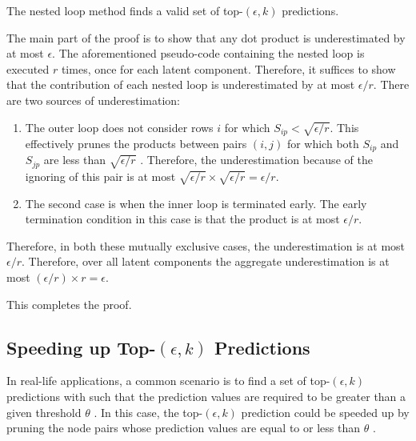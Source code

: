 \begin{prop}
\label{prop-valid-topk}
The nested loop method finds a valid set of top-$(\epsilon, k)$
predictions.
\end{prop}
\begin{IEEEproof}
The main part of the proof is to show that any dot product is
underestimated by at most  $\epsilon$. The aforementioned pseudo-code
containing the  nested loop is executed $r$ times, once for each
latent component. Therefore, it suffices to show that the
contribution of each nested loop is underestimated by at most
$\epsilon/r$. There are two sources of underestimation:
\begin{enumerate}
\item  The outer loop does not consider rows $i$ for which $S_{ip} <
\sqrt{\epsilon/r}$. This effectively prunes the products between
pairs $(i, j)$ for which both $S_{ip}$ and $S_{jp}$ are less
than $\sqrt{\epsilon/r}$ .
Therefore, the underestimation because of
the ignoring of this pair is at most $\sqrt{\epsilon/r} \times
\sqrt{\epsilon/r} = \epsilon/r$.
\item The second case is when the inner loop is terminated early.
The early termination condition in this case is that the product is
at most $\epsilon/r$.
\end{enumerate}
Therefore, in both these mutually exclusive cases, the
underestimation is at most $\epsilon/r$. Therefore, over all latent
components the aggregate underestimation is at most
$(\epsilon/r)\times r= \epsilon$.

This completes the proof.
\end{IEEEproof}

\subsection{Speeding up Top-$(\epsilon, k)$ Predictions}
\label{sec-NMF-topk-optimization}


 In real-life applications,
a common scenario is to find a set of top-$(\epsilon, k)$ predictions with such that the prediction
values are required to be greater than a given threshold $\theta$ \cite{ballard2015, lemp}. In this case,
the top-$(\epsilon, k)$ prediction could be speeded up by pruning the node pairs
whose prediction values are equal to or less than $\theta$ .

